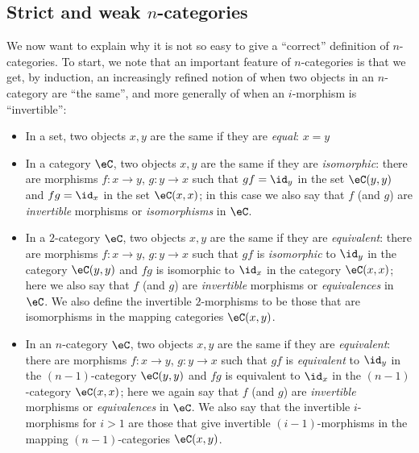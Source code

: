 \documentclass[a4paper,12pt]{article}
\begin{document}
\subsection{Strict and weak $n$-categories}\label{subsec:weak}
We now want to explain why it is not so easy to give a ``correct''
definition of $n$-categories. To start, we note that an important
feature of $n$-categories is that we get, by induction, an
increasingly refined
notion of when two objects in an $n$-category are ``the same'', and
more generally of when an $i$-morphism is ``invertible'':
\begin{itemize}
\item In a set, two objects $x,y$ are the same if they are
  \emph{equal}: $x = y$
\item In a category $\eC$, two objects $x, y$ are the same if they are
  \emph{isomorphic}: there are morphisms $f \colon x \to y$, $g \colon
  y \to x$ such that $gf = \id_{y}$ in the set $\eC(y,y)$ and $fg =
  \id_{x}$ in the set $\eC(x,x)$; in this case we also say that $f$ (and $g$)
  are \emph{invertible} morphisms or \emph{isomorphisms} in $\eC$.
\item In a $2$-category $\eC$, two objects $x, y$ are the same if they are
  \emph{equivalent}: there are morphisms $f \colon x \to y$, $g \colon
  y \to x$ such that $gf$ is \emph{isomorphic} to $\id_{y}$ in the
  category $\eC(y,y)$ and $fg$ is isomorphic to $\id_{x}$ in the
  category $\eC(x,x)$; here we also say that $f$ (and $g$)
  are \emph{invertible} morphisms or \emph{equivalences} in $\eC$. We
  also define the invertible $2$-morphisms to be those that are
  isomorphisms in the mapping categories $\eC(x,y)$.
\item In an $n$-category $\eC$, two objects $x, y$ are the same if they are
  \emph{equivalent}: there are morphisms $f \colon x \to y$, $g \colon
  y \to x$ such that $gf$ is \emph{equivalent} to $\id_{y}$ in the
  $(n-1)$-category $\eC(y,y)$ and $fg$ is equivalent to $\id_{x}$ in the
  $(n-1)$-category $\eC(x,x)$; here we again say that $f$ (and $g$)
  are \emph{invertible} morphisms or \emph{equivalences} in $\eC$. We
  also say that the invertible $i$-morphisms for $i > 1$ are those
  that give invertible $(i-1)$-morphisms in the mapping
  $(n-1)$-categories $\eC(x,y)$.
\end{itemize}
\end{document}
